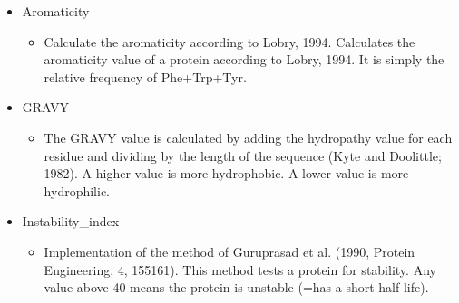 \documentclass[letterpaper,10pt,english]{jupyterBook}
\begin{document}
\begin{itemize}
\begin{itemize}
\end{itemize}

\item {} 
\sphinxAtStartPar
Aromaticity
\begin{itemize}
\item {} 
\sphinxAtStartPar
Calculate the aromaticity according to Lobry, 1994. Calculates the aromaticity value of a protein according to Lobry, 1994. It is simply the relative frequency of Phe+Trp+Tyr.

\end{itemize}

\item {} 
\sphinxAtStartPar
GRAVY
\begin{itemize}
\item {} 
\sphinxAtStartPar
The GRAVY value is calculated by adding the hydropathy value for each residue and dividing by the length of the sequence (Kyte and Doolittle; 1982). A higher value is more hydrophobic. A lower value is more hydrophilic.

\end{itemize}

\item {} 
\sphinxAtStartPar
Instability\_index
\begin{itemize}
\item {} 
\sphinxAtStartPar
Implementation of the method of Guruprasad et al. (1990, Protein Engineering, 4, 155\sphinxhyphen{}161). This method tests a protein for stability. Any value above 40 means the protein is unstable (=has a short half life).

\end{itemize}

\end{itemize}
\end{document}

